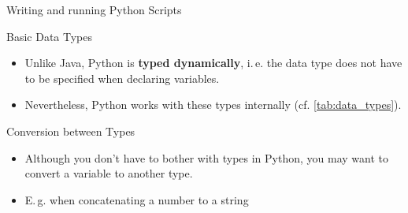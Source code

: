 \begin{dwHeaderFrame}{Writing and running Python Scripts}

\end{dwHeaderFrame}


\begin{frame}
	
\end{frame}



\begin{dwHeaderFrame}{Basic Data Types}
	\begin{itemize}
		\item Unlike Java, Python is \textbf{typed dynamically}, i.\,e. the data type does not have to be specified when declaring variables.
		\item Nevertheless, Python works with these types internally (cf. \cref{tab:data_types}).
	\end{itemize}
	
	
\end{dwHeaderFrame}


\begin{frame}
	
\end{frame}


\begin{dwHeaderFrame}{Conversion between Types}
	\begin{itemize}
		\item Although you don't have to bother with types in Python, you may want to convert a variable to another type.
		\item E.\,g. when concatenating a number to a string
	\end{itemize}
	
	
\end{dwHeaderFrame}


\makethanks


